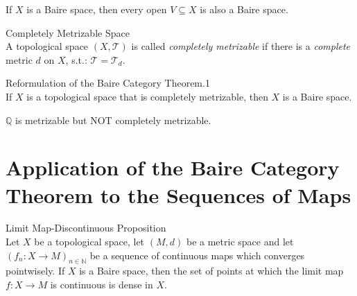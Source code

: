 \begin{lemma}
    If $X$ is a Baire space, then every open $V \subseteq X$ is also a Baire space.
\end{lemma}

\begin{definition}{Completely Metrizable Space}\\
A topological space $(X,\mathcal{T})$ is called \textit{completely metrizable} if there is a \textit{complete} metric $d$ on $X$, s.t.: $\mathcal{T} = \mathcal{T}_d$.
\end{definition}

\begin{theorem}{Reformulation of the Baire Category Theorem.1}\\
If $X$ is a topological space that is completely metrizable, then $X$ is a Baire space.
\end{theorem}

\begin{corollary}
    $\mathbb{Q}$ is metrizable but NOT completely metrizable.
\end{corollary}

\section{Application of the Baire Category Theorem to the Sequences of Maps}

\begin{proposition}{Limit Map-Discontinuous Proposition}\\
Let $X$ be a topological space, let $(M,d)$ be a metric space and let $(f_n: X \to M)_{n \in \mathbb{N}}$ be a sequence of continuous maps which converges pointwisely. If $X$ is a Baire space, then the set of points at which the limit map $f: X \to M$ is continuous is dense in $X$.
\end{proposition}

